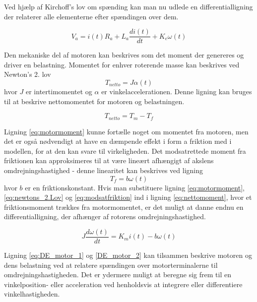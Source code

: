 Ved hjælp af Kirchoff's lov om spænding kan man nu udlede en differentialligning der relaterer alle elementerne efter spændingen over dem.

\begin{equation}\label{eq:DE_motor_1}
V_{a}=i(t)R_{a}+L_{a}\dfrac{di(t)}{dt}+K_{e}\omega(t)
\end{equation}

Den mekaniske del af motoren kan beskrives som det moment der genereres og driver en belastning. Momentet for enhver roterende masse kan beskrives ved Newton's 2. lov \\
\begin{equation}\label{eq:newtons_2.Lov}
T_{netto}=J\alpha(t)
\end{equation}
hvor $J$ er intertimomentet og $\alpha$ er vinkelaccelerationen. Denne ligning kan bruges til at beskrive nettomomentet for motoren og belastningen. 

\begin{equation}\label{eq:nettomoment}
T_{netto}=T_{m}-T_{f}
\end{equation}

Ligning \ref{eq:motormoment} kunne fortælle noget om momentet fra motoren, men det er også nødvendigt at have en dæmpende effekt i form a friktion med i modellen, for at den kan svare til virkeligheden. Det modsatrettede moment fra friktionen kan approksimeres til at være lineært afhængigt af akslens omdrejningshastighed - denne linearitet kan beskrives ved ligning
\begin{equation}\label{eq:modsatfriktion}
T_{f}=b\omega(t)
\end{equation}
hvor $b$ er en friktionskonstant. Hvis man substituere ligning \ref{eq:motormoment},\ref{eq:newtons_2.Lov} og \ref{eq:modsatfriktion} ind i ligning \ref{eq:nettomoment}, hvor et friktionsmoment trækkes fra motormomentet, er det muligt at danne endnu en differentialligning, der afhænger af rotorens omdrejningshastighed.

\begin{equation}\label{DE_motor_2}
J\dfrac{d\omega(t)}{dt}=K_{m}i(t)-b\omega(t)
\end{equation}

Ligning \ref{eq:DE_motor_1} og \ref{DE_motor_2} kan tilsammen beskrive motoren og dens belastning ved at relatere spændingen over motorterminalerne til omdrejningshastigheden. Det er ydermere muligt at beregne sig frem til en vinkelposition- eller acceleration ved henholdsvis at integrere eller differentiere vinkelhastigheden.

